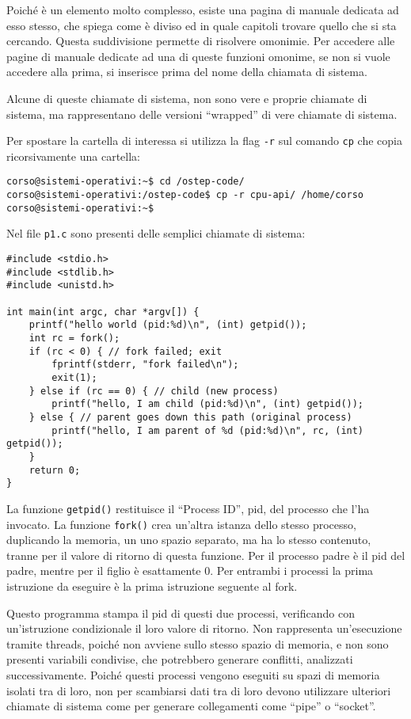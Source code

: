 \documentclass{article}
\numberwithin{equation}{subsection}
\begin{document}
Poiché è un elemento molto complesso, esiste una pagina di manuale dedicata ad esso stesso, che spiega come è diviso ed in quale capitoli trovare quello che si sta 
cercando. Questa suddivisione permette di risolvere omonimie. Per accedere alle pagine di manuale dedicate ad una di queste funzioni omonime, se non si vuole accedere 
alla prima, si inserisce prima del nome della chiamata di sistema. 

Alcune di queste chiamate di sistema, non sono vere e proprie chiamate di sistema, ma rappresentano delle versioni ``wrapped'' di vere chiamate di sistema. 

Per spostare la cartella di interessa si utilizza la flag \verb|-r| sul comando \verb|cp| che copia ricorsivamente una cartella:
\begin{verbatim}
corso@sistemi-operativi:~$ cd /ostep-code/
corso@sistemi-operativi:/ostep-code$ cp -r cpu-api/ /home/corso 
corso@sistemi-operativi:~$
\end{verbatim}

Nel file \verb|p1.c| sono presenti delle semplici chiamate di sistema:
\begin{verbatim}
#include <stdio.h>
#include <stdlib.h>
#include <unistd.h>

int main(int argc, char *argv[]) {
    printf("hello world (pid:%d)\n", (int) getpid());
    int rc = fork();
    if (rc < 0) { // fork failed; exit
        fprintf(stderr, "fork failed\n");
        exit(1);
    } else if (rc == 0) { // child (new process)
        printf("hello, I am child (pid:%d)\n", (int) getpid());
    } else { // parent goes down this path (original process)
        printf("hello, I am parent of %d (pid:%d)\n", rc, (int) getpid());
    }
    return 0;
}
\end{verbatim}


La funzione \verb|getpid()| restituisce il ``Process ID'', pid, del processo che l'ha invocato. 
La funzione \verb|fork()| crea un'altra istanza dello stesso processo, duplicando la memoria, un uno spazio separato, ma ha lo stesso 
contenuto, tranne per il valore di ritorno di questa funzione. Per il processo padre è il pid del padre, mentre per il figlio è esattamente 0. Per entrambi i processi 
la prima istruzione da eseguire è la prima istruzione seguente al fork. 

Questo programma stampa il pid di questi due processi, verificando con un'istruzione condizionale il loro valore di ritorno. 
Non rappresenta un'esecuzione tramite threads, poiché non avviene sullo stesso spazio di memoria, e non sono presenti variabili condivise, che potrebbero generare 
conflitti, analizzati successivamente. Poiché questi processi vengono eseguiti su spazi di memoria isolati tra di loro, non per scambiarsi dati tra di loro devono 
utilizzare ulteriori chiamate di sistema come per generare collegamenti come ``pipe'' o ``socket''. 
\end{document}
